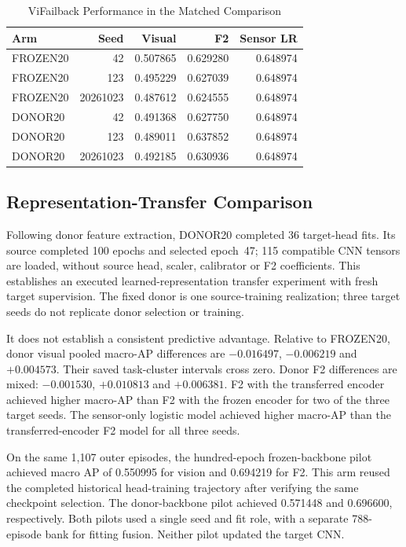 \begin{table}[htbp]
\caption{ViFailback Performance in the Matched Comparison}\label{tab:vif-matched}
\centering\small

\begin{tabular}{lrrrr}\hline Arm&Seed&Visual&F2&Sensor LR\\\hline
FROZEN20&42&0.507865&0.629280&0.648974\\
FROZEN20&123&0.495229&0.627039&0.648974\\
FROZEN20&20261023&0.487612&0.624555&0.648974\\
DONOR20&42&0.491368&0.627750&0.648974\\
DONOR20&123&0.489011&0.637852&0.648974\\
DONOR20&20261023&0.492185&0.630936&0.648974\\\hline
\end{tabular}
\end{table}

\subsection{Representation-Transfer Comparison}
Following donor feature extraction, DONOR20 completed 36 target-head fits. Its source
completed 100 epochs and selected epoch~47; 115 compatible CNN tensors are loaded,
without source head, scaler, calibrator or F2 coefficients. This establishes an executed
learned-representation transfer experiment with fresh target supervision. The fixed
donor is one source-training realization; three target seeds do not replicate donor
selection or training.

It does not establish a consistent predictive advantage. Relative to FROZEN20, donor
visual pooled macro-AP differences are $-0.016497$, $-0.006219$ and $+0.004573$. Their
saved task-cluster intervals cross zero. Donor F2 differences are mixed: $-0.001530$,
$+0.010813$ and $+0.006381$. F2 with the transferred encoder achieved higher macro-AP
than F2 with the frozen encoder for two of the three target seeds. The sensor-only
logistic model achieved higher macro-AP than the transferred-encoder F2 model for all
three seeds.

On the same 1,107 outer episodes, the hundred-epoch frozen-backbone pilot achieved macro
AP of 0.550995 for vision and 0.694219 for F2. This arm reused the completed historical
head-training trajectory after verifying the same checkpoint selection. The
donor-backbone pilot achieved 0.571448 and 0.696600, respectively. Both pilots used a
single seed and fit role, with a separate 788-episode bank for fitting fusion. Neither
pilot updated the target CNN.

